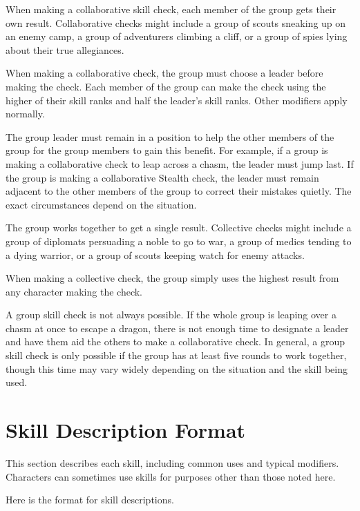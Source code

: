              When making a collaborative skill check, each member of the group gets their own result. Collaborative checks might include a group of scouts sneaking up on an enemy camp, a group of adventurers climbing a cliff, or a group of spies lying about their true allegiances.

            When making a collaborative check, the group must choose a leader before making the check. Each member of the group can make the check using the higher of their skill ranks and half the leader's skill ranks. Other modifiers apply normally.

            The group leader must remain in a position to help the other members of the group for the group members to gain this benefit. For example, if a group is making a collaborative check to leap across a chasm, the leader must jump last. If the group is making a collaborative Stealth check, the leader must remain adjacent to the other members of the group to correct their mistakes quietly. The exact circumstances depend on the situation.

             The group works together to get a single result. Collective checks might include a group of diplomats persuading a noble to go to war, a group of medics tending to a dying warrior, or a group of scouts keeping watch for enemy attacks.

            When making a collective check, the group simply uses the highest result from any character making the check.

             A group skill check is not always possible. If the whole group is leaping over a chasm at once to escape a dragon, there is not enough time to designate a leader and have them aid the others to make a collaborative check. In general, a group skill check is only possible if the group has at least five rounds to work together, though this time may vary widely depending on the situation and the skill being used.

\section{Skill Description Format}
    This section describes each skill, including common uses and typical modifiers. Characters can sometimes use skills for purposes other than those noted here.

    Here is the format for skill descriptions.

